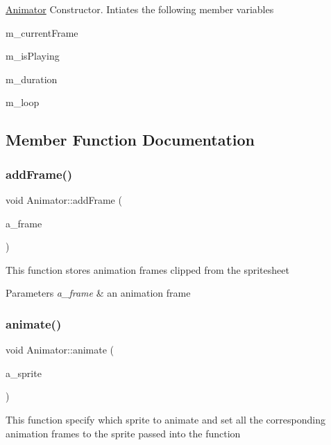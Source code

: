 \hyperlink{class_animator}{Animator} Constructor. Intiates the following member variables
\begin{DoxyItemize}
\item m\+\_\+current\+Frame
\item m\+\_\+is\+Playing
\item m\+\_\+duration
\item m\+\_\+loop 
\end{DoxyItemize}

\subsection{Member Function Documentation}
\mbox{\label{class_animator_a69e57eedcfb49c3b6d7802ff906486b7}} 
\subsubsection{\texorpdfstring{add\+Frame()}{addFrame()}}
{\footnotesize\ttfamily void Animator\+::add\+Frame (\begin{DoxyParamCaption}\item[{sf\+::\+Int\+Rect}]{a\+\_\+frame }\end{DoxyParamCaption})}

This function stores animation frames clipped from the spritesheet


\begin{DoxyParams}{Parameters}
{\em a\+\_\+frame} & an animation frame \\
\hline
\end{DoxyParams}
\mbox{\label{class_animator_acb1e3abc21b1ea2133baa4bd089062a0}} 
\subsubsection{\texorpdfstring{animate()}{animate()}}
{\footnotesize\ttfamily void Animator\+::animate (\begin{DoxyParamCaption}\item[{sf\+::\+Sprite \&}]{a\+\_\+sprite }\end{DoxyParamCaption})}

This function specify which sprite to animate and set all the corresponding animation frames to the sprite passed into the function


